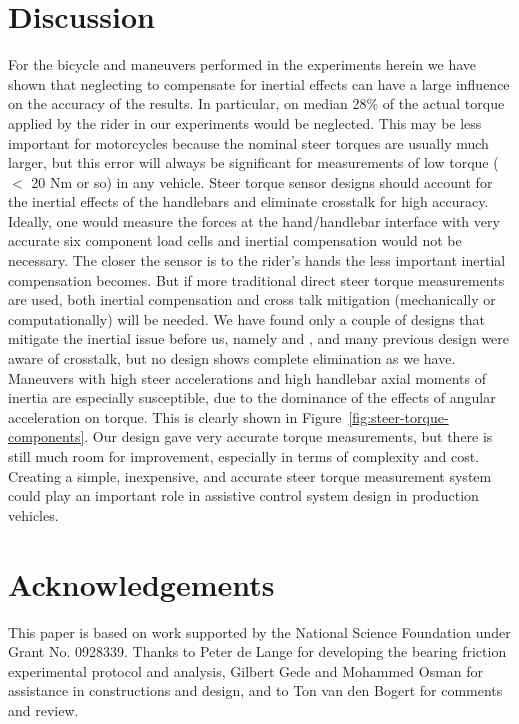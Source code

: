 \documentclass[10pt]{article}
\begin{document}
\section*{Discussion}

For the bicycle and maneuvers performed in the experiments herein we have shown
that neglecting to compensate for inertial effects can have a large influence
on the accuracy of the results. In particular, on median 28\% of the actual
torque applied by the rider in our experiments would be neglected. This may be
less important for motorcycles because the nominal steer torques are usually
much larger, but this error will always be significant for measurements of low
torque ($<$ 20 Nm or so) in any vehicle. Steer torque sensor designs should
account for the inertial effects of the handlebars and eliminate crosstalk for
high accuracy. Ideally, one would measure the forces at the hand/handlebar
interface with very accurate six component load cells and inertial compensation
would not be necessary. The closer the sensor is to the rider's hands the less
important inertial compensation becomes. But if more traditional direct steer
torque measurements are used, both inertial compensation and cross talk
mitigation (mechanically or computationally) will be needed. We have found only
a couple of designs that mitigate the inertial issue before us, namely
\cite{Evertse2010} and \cite{Iuchi2006}, and many previous design were aware of
crosstalk, but no design shows complete elimination as we have. Maneuvers with
high steer accelerations and high handlebar axial moments of inertia are
especially susceptible, due to the dominance of the effects of angular
acceleration on torque. This is clearly shown in
Figure~\ref{fig:steer-torque-components}. Our design gave very accurate torque
measurements, but there is still much room for improvement, especially in terms
of complexity and cost. Creating a simple, inexpensive, and accurate steer
torque measurement system could play an important role in assistive control
system design in production vehicles.

\section*{Acknowledgements}

This paper is based on work supported by the National Science Foundation under
Grant No. 0928339. Thanks to Peter de Lange for developing the bearing friction
experimental protocol and analysis, Gilbert Gede and Mohammed Osman for
assistance in constructions and design, and to Ton van den Bogert for comments
and review.
\end{document}
